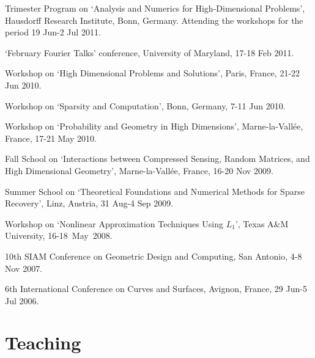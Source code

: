 \documentclass[11pt]{article}
\begin{document}
\item Trimester Program on `Analysis and Numerics for High-Dimensional Problems', Hausdorff Research Institute, Bonn, Germany.
Attending the workshops for the period 19 Jun-2 Jul 2011.
\item `February Fourier Talks' conference, University of Maryland, 17-18 Feb 2011.
\item Workshop on `High Dimensional Problems and Solutions', Paris, France, 21-22 Jun 2010.
\item Workshop on `Sparsity and Computation', Bonn, Germany, 7-11 Jun 2010.
\item Workshop on `Probability and Geometry in High Dimensions', Marne-la-Vall\'ee, France, 17-21 May 2010.
\item Fall School on `Interactions between Compressed Sensing, Random Matrices, and High Dimensional Geometry', Marne-la-Vall\'ee, France, 16-20 Nov 2009.
\item Summer School on `Theoretical Foundations and Numerical Methods for Sparse Recovery', Linz, Austria, 31 Aug-4 Sep 2009.
\item Workshop on `Nonlinear  Approximation Techniques Using  $L_1$', Texas A\&M University, 16-18~May~2008.
\item 10th SIAM Conference on Geometric Design and Computing, San Antonio, 4-8 Nov 2007.
\item 6th International Conference on Curves and Surfaces, Avignon, France, 29 Jun-5 Jul  2006.
\eitemize


\section{Teaching}
\end{document}
